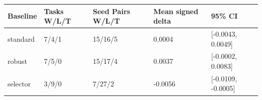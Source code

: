 \begin{tabular}{lllll}
\toprule
Baseline & Tasks W/L/T & Seed Pairs W/L/T & Mean signed delta & 95\% CI \\
\midrule
standard & 7/4/1 & 15/16/5 & 0.0004 & [-0.0043, 0.0049] \\
robust & 7/5/0 & 15/17/4 & 0.0037 & [-0.0002, 0.0083] \\
selector & 3/9/0 & 7/27/2 & -0.0056 & [-0.0109, -0.0005] \\
\bottomrule
\end{tabular}
